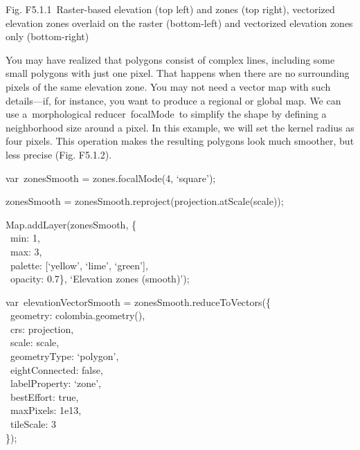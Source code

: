 \documentclass[
  letterpaper,
  DIV=11,
  numbers=noendperiod]{scrreprt}
\begin{document}
Fig. F5.1.1~Raster-based elevation (top left) and zones (top right),
vectorized elevation zones overlaid on the raster (bottom-left) and
vectorized elevation zones only (bottom-right)

You may have realized that polygons consist of complex lines, including
some small polygons with just one pixel. That happens when there are no
surrounding pixels of the same elevation zone. You may not need a vector
map with such details---if, for instance, you want to produce a regional
or global map. We can use a~morphological reducer~focalMode~to simplify
the shape by defining a neighborhood size around a pixel. In this
example, we will set the kernel radius as four pixels. This operation
makes the resulting polygons look much smoother, but less precise (Fig.
F5.1.2).

var~zonesSmooth = zones.focalMode(4, `square');

zonesSmooth = zonesSmooth.reproject(projection.atScale(scale));

Map.addLayer(zonesSmooth, \{\\
\hspace*{0.333em} ~min: 1,\\
\hspace*{0.333em} ~max: 3,\\
\hspace*{0.333em} ~palette: {[}`yellow', `lime', `green'{]},\\
\hspace*{0.333em} ~opacity: 0.7\}, `Elevation zones (smooth)');

var~elevationVectorSmooth = zonesSmooth.reduceToVectors(\{\\
\hspace*{0.333em} ~geometry: colombia.geometry(),\\
\hspace*{0.333em} ~crs: projection,\\
\hspace*{0.333em} ~scale: scale,\\
\hspace*{0.333em} ~geometryType: `polygon',\\
\hspace*{0.333em} ~eightConnected: false,\\
\hspace*{0.333em} ~labelProperty: `zone',\\
\hspace*{0.333em} ~bestEffort: true,\\
\hspace*{0.333em} ~maxPixels: 1e13,\\
\hspace*{0.333em} ~tileScale: 3\\
\});
\end{document}
